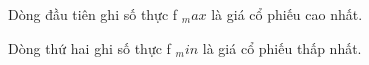 Dòng đầu tiên ghi số thực f $_ max $ là giá cổ phiếu cao nhất.

Dòng thứ hai ghi số thực f $_ min $ là giá cổ phiếu thấp nhất.

\